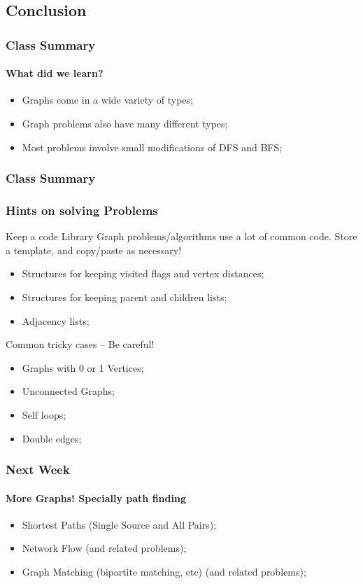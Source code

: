 \documentclass{beamer}
\begin{document}
\subsection{Conclusion}
\begin{frame}
  \frametitle{Class Summary}
  \framesubtitle{What did we learn?}
  \begin{itemize}
  \item Graphs come in a wide variety of types;
  \item Graph problems also have many different types;
  \item Most problems involve small modifications of DFS and BFS;
  \end{itemize}
\end{frame}

\begin{frame}
  \frametitle{Class Summary}
  \frametitle{Hints on solving Problems}

  
  {\smaller
    \begin{block}{Keep a code Library}
      Graph problems/algorithms use a lot of common code. Store a
      template, and copy/paste as necessary!
      \bigskip
      \begin{itemize}
      \item Structures for keeping visited flags and vertex distances;
      \item Structures for keeping parent and children lists;
      \item Adjacency lists;
      \end{itemize}
      
  \end{block}
  \begin{block}{Common tricky cases -- Be careful!}
    \begin{itemize}
    \item Graphs with 0 or 1 Vertices;
    \item Unconnected Graphs;
    \item Self loops;
    \item Double edges;
    \end{itemize}
  \end{block}
  }
\end{frame}

\begin{frame}
  \frametitle{Next Week}
  \framesubtitle{More Graphs! Specially path finding}
  \begin{itemize}
  \item Shortest Paths (Single Source and All Pairs);
  \item Network Flow (and related problems);
  \item Graph Matching (bipartite matching, etc) (and related problems);
  \end{itemize}
\end{frame}
\end{document}
